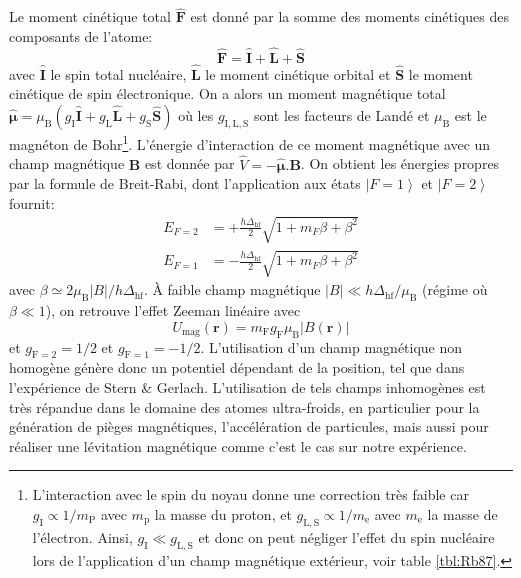 Le moment cinétique total $\hat{\mathbf{F}}$ est donné par la somme des moments cinétiques des composants de l'atome:
\begin{equation}
\hat{\mathbf{F}}=\hat{\mathbf{I}}+\hat{\mathbf{L}}+\hat{\mathbf{S}}
\end{equation}
avec $\hat{\mathbf{I}}$ le spin total nucléaire, $\hat{\mathbf{L}}$ le moment cinétique orbital et $\hat{\mathbf{S}}$ le moment cinétique de spin électronique. On a alors un moment magnétique total $\hat{\boldsymbol\mu}=\mu_{\mathrm{B}} (g_{\mathrm{I}} \hat{\mathbf{I}} + g_{\mathrm{L}} \hat{\mathbf{L}} + g_{\mathrm{S}} \hat{\mathbf{S}})$ où les $g_{\mathrm{I},\mathrm{L},\mathrm{S}}$ sont les facteurs de Landé et $\mu_{\mathrm{B}}$ est le magnéton de Bohr\footnote{L'interaction avec le spin du noyau donne une correction très faible car $g_{\mathrm{I}}\propto 1/m_{\mathrm{P}}$ avec $m_{\mathrm{p}}$ la masse du proton, et $g_{\mathrm{L,S}} \propto 1/m_{\mathrm{e}}$ avec $m_{\mathrm{e}}$ la masse de l'électron. Ainsi, $g_{\mathrm{I}} \ll g_{\mathrm{L,S}}$ et donc on peut négliger l'effet du spin nucléaire lors de l'application d'un champ magnétique extérieur, voir table \ref{tbl:Rb87}.}. L'énergie d'interaction de ce moment magnétique avec un champ magnétique $\mathbf{B}$ est donnée par $\hat{V}=-\hat{\boldsymbol\mu}.\mathbf{B}$. On obtient les énergies propres par la formule de Breit-Rabi, dont l'application aux états $\left| F=1 \right\rangle$ et $\left| F=2 \right\rangle$ fournit:
\begin{equation}
\begin{aligned}
E_{F=2} &= + \frac{h \Delta_{\mathrm{hf}}}{2} \sqrt{1+ m_F \beta +\beta^2} \\
E_{F=1} &= - \frac{h \Delta_{\mathrm{hf}}}{2} \sqrt{1+ m_F \beta +\beta^2}
\end{aligned}
\end{equation}
avec $\beta \simeq 2 \mu_{\mathrm{B}} \left| B \right| /h \Delta_{\mathrm{hf}}$. À faible champ magnétique $\left| B \right| \ll h \Delta_{\mathrm{hf}} / \mu_{\mathrm{B}}$ (régime où $\beta \ll 1$), on retrouve l'effet Zeeman linéaire avec
\begin{equation}
U_{\mathrm{mag}} (\mathbf{r}) = m_{\mathrm{F}} g_{\mathrm{F}} \mu_{\mathrm{B}} \left| B(\mathbf{r}) \right|
\end{equation}
et $g_{\mathrm{F}=2}= 1/2$ et $g_{\mathrm{F}=1} =-1/2$. L'utilisation d'un champ magnétique non homogène génère donc un potentiel dépendant de la position, tel que dans l'expérience de Stern \& Gerlach. L'utilisation de tels champs inhomogènes est très répandue dans le domaine des atomes ultra-froids, en particulier pour la génération de pièges magnétiques, l'accélération de particules, mais aussi pour réaliser une lévitation magnétique comme c'est le cas sur notre expérience. 







